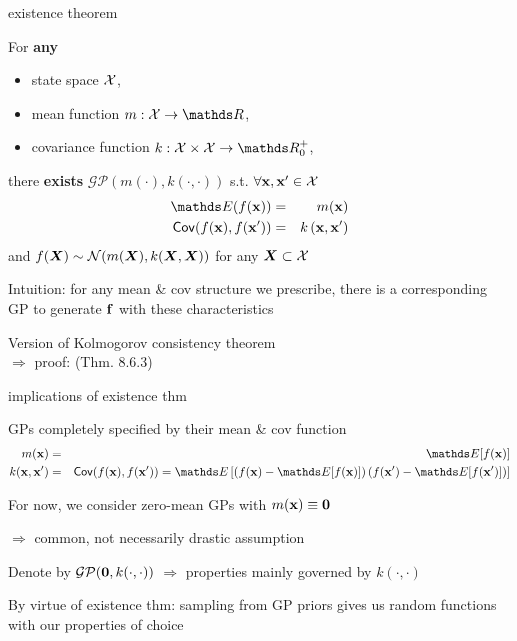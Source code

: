 \documentclass[11pt,compress,t,notes=noshow, xcolor=table]{beamer}
\begin{document}
\begin{framei}[sep=L]{existence theorem}
\item For \textbf{any} 
\begin{itemize}
\item state space $\mathcal{X}$,
\item mean function $m: \Xspace \rightarrow \R$,
\item covariance function $k: \Xspace \times \Xspace \rightarrow \R^+_0$, 
\end{itemize}
\vfill
there \textbf{exists} $\mathcal{GP}(m(\cdot), k(\cdot, \cdot))$ s.t. $\forall \mathbf{x}, \mathbf{x}^\prime \in \mathcal{X}$
\begin{eqnarray*}
\E(\fx) &=& m(\xv) \\
\cov(\fx, f(\xv^\prime)) &=& \kxxp
\end{eqnarray*}
and $f(\bm{X}) \sim \mathcal{N}(m(\bm{X}), k(\bm{X}, \bm{X}))$ for any $\bm{X} \subset \mathcal{X}$
\item Intuition: for any mean \& cov structure we prescribe, there is a corresponding GP to generate $\mathbf{f}$ with these characteristics
\item Version of Kolmogorov consistency theorem  \\
$\Rightarrow$ proof:  (Thm. 8.6.3)
\end{framei}

\begin{framei}[sep=L]{implications of existence thm}
\item GPs completely specified by their mean \& cov function
\begin{eqnarray*}
m(\xv) &=& \E[f(\xv)] \\
k(\xv, \xv^\prime) &=& \cov(\fx, f(\xv^\prime)) = \E \left[\left( f(\xv) - \E[f(\xv)] \right) \left( f(\xv^\prime) - \E[f(\xv^\prime)] \right) \right]
\end{eqnarray*}
\item For now, we consider zero-mean GPs with $m(\mathbf{x}) \equiv \mathbf{0}$ 

$\Rightarrow$ common, not necessarily drastic assumption 
\item Denote by $\mathcal{GP}(\mathbf{0}, k(\cdot, \cdot))$ $\Rightarrow$ properties mainly governed by $k(\cdot, \cdot)$
\item By virtue of existence thm: sampling from GP priors gives us random functions with our properties of choice
\end{framei}
\end{document}
